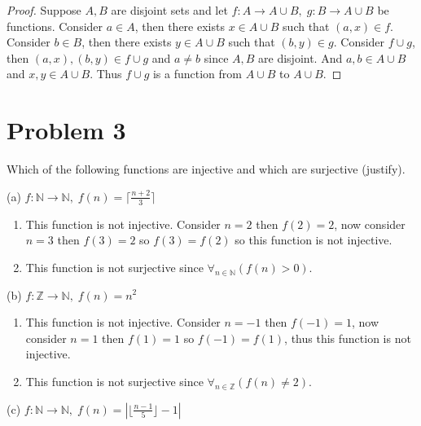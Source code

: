 \documentclass{article}
\begin{document}
    \begin{proof}
        Suppose $A,B$ are disjoint sets and let $f : A \rightarrow A \cup B,\; g : B \rightarrow A \cup B$ be
        functions. Consider $a\in A$, then there exists $x\in A\cup B$ such that $(a,x)\in f$.
        Consider $b\in B$, then there exists $y\in A\cup B$ such that $(b,y)\in g$.
        Consider $f\cup g$, then $(a,x),(b,y)\in f\cup g$ and $a\neq b$ since $A,B$ are 
        disjoint. And $a,b \in A\cup B$ and $x,y\in A\cup B$. Thus $f \cup g$ is a function from $A \cup B$ to $A \cup B$.
    \end{proof}



    \section*{Problem 3}

    Which of the following functions are injective and which are surjective (justify).

    (a) $f:\mathbb{N}\rightarrow\mathbb{N},\; f(n)=\lceil\frac{n+2}{3}\rceil$

    \begin{enumerate}[label=\quad\quad, leftmargin=*]
        \item 
        This function is not injective. Consider $n=2$ then $f(2)=2$, now consider $n=3$ then 
        $f(3) = 2$ so $f(3) = f(2)$ so this function is not injective.
        \item
        This function is not surjective since $\forall_{n\in\mathbb{N}}(f(n) > 0)$.
    \end{enumerate}

    (b) $f:\mathbb{Z}\rightarrow\mathbb{N},\; f(n)=n^2$

    \begin{enumerate}[label=\quad\quad, leftmargin=*]
        \item 
        This function is not injective. Consider $n=-1$ then $f(-1)=1$, now consider $n=1$ then 
        $f(1) = 1$ so $f(-1)=f(1)$, thus this function is not injective.
        \item
        This function is not surjective since $\forall_{n\in\mathbb{Z}}(f(n) \neq 2)$.
    \end{enumerate}
    
    (c) $f:\mathbb{N}\rightarrow\mathbb{N},\; f(n)=|\lfloor\frac{n-1}{5}\rfloor-1|$
\end{document}
